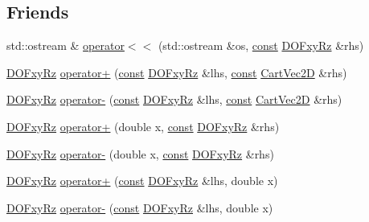 \subsection*{Friends}
\begin{DoxyCompactItemize}
\item 
std\+::ostream \& \hyperlink{class_d_o_fxy_rz_a1ac21ee73e0159236cde20f41914a132}{operator$<$$<$} (std\+::ostream \&os, \hyperlink{functions__c_8js_afacfd9c985d225bb07483b887a801b6f}{const} \hyperlink{class_d_o_fxy_rz}{D\+O\+Fxy\+Rz} \&rhs)
\item 
\hyperlink{class_d_o_fxy_rz}{D\+O\+Fxy\+Rz} \hyperlink{class_d_o_fxy_rz_aea029119f4f15e337343dd9674c53314}{operator+} (\hyperlink{functions__c_8js_afacfd9c985d225bb07483b887a801b6f}{const} \hyperlink{class_d_o_fxy_rz}{D\+O\+Fxy\+Rz} \&lhs, \hyperlink{functions__c_8js_afacfd9c985d225bb07483b887a801b6f}{const} \hyperlink{class_cart_vec2_d}{Cart\+Vec2D} \&rhs)
\item 
\hyperlink{class_d_o_fxy_rz}{D\+O\+Fxy\+Rz} \hyperlink{class_d_o_fxy_rz_adb707d2ec2d85ef225d3ecedd0f72afa}{operator-\/} (\hyperlink{functions__c_8js_afacfd9c985d225bb07483b887a801b6f}{const} \hyperlink{class_d_o_fxy_rz}{D\+O\+Fxy\+Rz} \&lhs, \hyperlink{functions__c_8js_afacfd9c985d225bb07483b887a801b6f}{const} \hyperlink{class_cart_vec2_d}{Cart\+Vec2D} \&rhs)
\item 
\hyperlink{class_d_o_fxy_rz}{D\+O\+Fxy\+Rz} \hyperlink{class_d_o_fxy_rz_a3a29ac2f2a3ca9a5e9e960ce82f176bf}{operator+} (double x, \hyperlink{functions__c_8js_afacfd9c985d225bb07483b887a801b6f}{const} \hyperlink{class_d_o_fxy_rz}{D\+O\+Fxy\+Rz} \&rhs)
\item 
\hyperlink{class_d_o_fxy_rz}{D\+O\+Fxy\+Rz} \hyperlink{class_d_o_fxy_rz_af2be5dcffff5323bcbfcaf49a4c291e8}{operator-\/} (double x, \hyperlink{functions__c_8js_afacfd9c985d225bb07483b887a801b6f}{const} \hyperlink{class_d_o_fxy_rz}{D\+O\+Fxy\+Rz} \&rhs)
\item 
\hyperlink{class_d_o_fxy_rz}{D\+O\+Fxy\+Rz} \hyperlink{class_d_o_fxy_rz_a504a54dd40576418831f0383ebd9f93a}{operator+} (\hyperlink{functions__c_8js_afacfd9c985d225bb07483b887a801b6f}{const} \hyperlink{class_d_o_fxy_rz}{D\+O\+Fxy\+Rz} \&lhs, double x)
\item 
\hyperlink{class_d_o_fxy_rz}{D\+O\+Fxy\+Rz} \hyperlink{class_d_o_fxy_rz_a855ad18215b9bcfbc09ca9e5b532b9d4}{operator-\/} (\hyperlink{functions__c_8js_afacfd9c985d225bb07483b887a801b6f}{const} \hyperlink{class_d_o_fxy_rz}{D\+O\+Fxy\+Rz} \&lhs, double x)
\end{DoxyCompactItemize}


